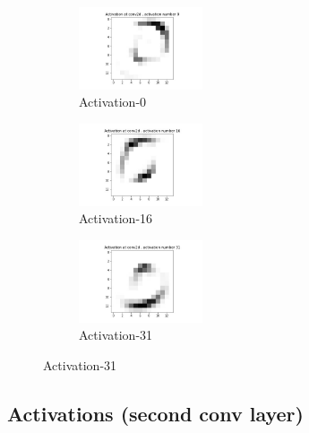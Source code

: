 \begin{figure}[!htbp]
\begin{subfigure}
\centering
\includegraphics[angle=0,width=0.4\textwidth]{assign-2/logs/vis/activation-conv2d-0.jpg}
\caption{Activation-0}
\end{subfigure}
\begin{subfigure}
\centering
\includegraphics[angle=0,width=0.4\textwidth]{assign-2/logs/vis/activation-conv2d-16.jpg}
\caption{Activation-16}
\end{subfigure}
\begin{subfigure}
\centering
\includegraphics[angle=0,width=0.4\textwidth]{assign-2/logs/vis/activation-conv2d-31.jpg}
\caption{Activation-31}
\end{subfigure}
\end{figure}

\subsection{Activations (second conv layer)}

